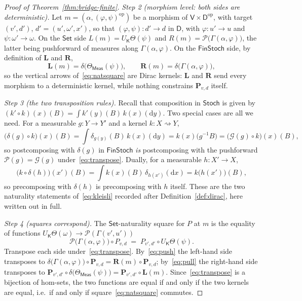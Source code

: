 \documentclass[11pt,a4paper]{article}
\theoremstyle{plain}
\theoremstyle{definition}
\theoremstyle{remark}
\newcommand{\cat}[1]{\mathsf{#1}}
\newcommand{\catV}{\cat{V}}
\newcommand{\catD}{\cat{D}}
\newcommand{\catK}{\cat{K}}
\newcommand{\Meas}{\cat{Meas}}
\newcommand{\Set}{\cat{Set}}
\newcommand{\Stoch}{\cat{Stoch}}
\newcommand{\FinStoch}{\cat{FinStoch}}
\newcommand{\G}{\mathcal{G}}
\newcommand{\Prb}{\mathcal{P}}
\newcommand{\op}{\mathrm{op}}
\newcommand{\del}{\delta}
\begin{document}
\begin{proof}[Proof of Theorem~\ref{thm:bridge-finite}]
\emph{Step 2 (morphism level: both sides are deterministic).} Let
$m = (\alpha, (\varphi,\psi)^{\op})$ be a morphism of
$\catV \times \catD^{\op}$, with target $(v',d')$, $d' = (u',\omega',x')$, so
that $(\varphi,\psi) \colon d' \to d$ in $\catD$, with
$\varphi \colon u' \to u$ and $\psi \colon \omega' \to \omega$. On
the $\Set$ side $L(m) = U_\catK\Theta(\psi)$ and
$R(m) = \Prb\bigl(\Gamma(\alpha,\varphi)\bigr)$, the latter being pushforward
of measures along $\Gamma(\alpha,\varphi)$. On the $\FinStoch$ side, by
definition of $\mathbf{L}$ and $\mathbf{R}$,
\[
\mathbf{L}(m) = \del\bigl(\Theta_\Meas(\psi)\bigr),
\qquad
\mathbf{R}(m) = \del\bigl(\Gamma(\alpha,\varphi)\bigr),
\]
so the vertical arrows of~\eqref{eq:natsquare} are Dirac kernels: $\mathbf{L}$
and $\mathbf{R}$ send every morphism to a deterministic kernel, while nothing
constrains $\mathbf{P}_{v,d}$ itself.

\emph{Step 3 (the two transposition rules).} Recall that composition in
$\Stoch$ is given by
$(k' \circ k)(x)(B) = \int k'(y)(B)\, k(x)(\mathrm{d}y)$.
Two special cases are all we need. For a measurable $g \colon Y \to Y'$ and a kernel
$k \colon X \rightsquigarrow Y$,
\begin{equation}\label{eq:push}
\bigl(\del(g) \circ k\bigr)(x)(B)
= \int \delta_{g(y)}(B)\, k(x)(\mathrm{d}y)
= k(x)\bigl(g^{-1}B\bigr)
= \bigl(\G(g) \circ k\bigr)(x)(B),
\end{equation}
so postcomposing with $\del(g)$ in $\FinStoch$ \emph{is} postcomposing with
the pushforward $\Prb(g) = \G(g)$ under~\eqref{eq:transpose}. Dually, for a
measurable $h \colon X' \to X$,
\begin{equation}\label{eq:pull}
\bigl(k \circ \del(h)\bigr)(x')(B)
= \int k(x)(B)\, \delta_{h(x')}(\mathrm{d}x)
= k\bigl(h(x')\bigr)(B),
\end{equation}
so precomposing with $\del(h)$ is precomposing with $h$ itself. These are
the two naturality statements of~\eqref{eq:kleisli} recorded after
Definition~\ref{def:dirac}, here written out in full.

\emph{Step 4 (squares correspond).} The $\Set$-naturality square for $P$ at
$m$ is the equality of functions
$U_\catK\Theta(\omega) \to \Prb(\Gamma(v',u'))$
\[
\Prb\bigl(\Gamma(\alpha,\varphi)\bigr) \circ P_{v,d}
\;=\; P_{v',d'} \circ U_\catK\Theta(\psi).
\]
Transpose each side under~\eqref{eq:transpose}. By~\eqref{eq:push} the
left-hand side transposes to
$\del\bigl(\Gamma(\alpha,\varphi)\bigr) \circ \mathbf{P}_{v,d}
= \mathbf{R}(m) \circ \mathbf{P}_{v,d}$; by~\eqref{eq:pull} the right-hand
side transposes to
$\mathbf{P}_{v',d'} \circ \del\bigl(\Theta_\Meas(\psi)\bigr)
= \mathbf{P}_{v',d'} \circ \mathbf{L}(m)$. Since~\eqref{eq:transpose} is a
bijection of hom-sets, the two functions are equal if and only if the two
kernels are equal, i.e.\ if and only if square~\eqref{eq:natsquare} commutes.


\end{proof}
\end{document}
